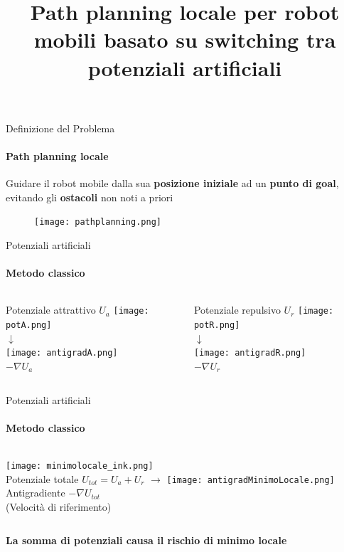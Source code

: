 \documentclass[handout]{beamer}
\title{Path planning locale per robot mobili basato su switching tra potenziali artificiali}
\author{}
\date{}
\begin{document}
\frame{\maketitle}

\begin{frame}{Definizione del Problema}
\framesubtitle{Path planning locale}
Guidare il robot mobile dalla sua \textbf{posizione iniziale} ad un \textbf{punto di goal}, evitando gli \textbf{ostacoli} non noti a priori
\begin{figure}
\centering
\texttt{[image: pathplanning.png]}
\end{figure}
\end{frame}

\begin{frame}{Potenziali artificiali}
\framesubtitle{Metodo classico}
\begin{columns}

	\centering
	{\small Potenziale attrattivo $U_a$}
	\texttt{[image: potA.png]} \\
	$\downarrow$\\
	\texttt{[image: antigradA.png]} \\
	$-\nabla U_a$

	\centering
	{\small Potenziale repulsivo $U_r$}
	\texttt{[image: potR.png]} \\
	$\downarrow$\\
	\texttt{[image: antigradR.png]} \\
	$-\nabla U_r$
\end{columns}
\end{frame}

\begin{frame}{Potenziali artificiali}
\framesubtitle{Metodo classico}

\vspace{5mm}
\begin{columns}
\centering
\texttt{[image: minimolocale\_ink.png]} \\
Potenziale totale \(U_{tot} = U_a + U_r\)
\centering
$\rightarrow$
\centering
\texttt{[image: antigradMinimoLocale.png]} \\
Antigradiente $-\nabla U_{tot}$ \\
(Velocità di riferimento)
\end{columns}

\vspace{10mm}

\centering
\begin{tcolorbox}[colframe=red!50!white , center upper , colback=white]
\textbf{La somma di potenziali causa il rischio di minimo locale}
\end{tcolorbox}
\end{frame}
\end{document}
